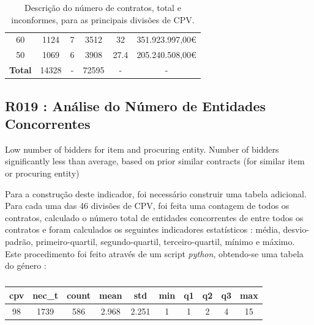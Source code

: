 \begin{table}[H]
{\begin{tabular}{cccccc}
		60                   & 1124                                                                                & 7           & 3512                                                                          & 32          & 351.923.997,00€                                                           \\
		50                   & 1069                                                                                & 6           & 3908                                                                          & 27.4        & 205.240.508,00€                                                           \\ \midrule
		\textbf{Total}       & 14328                                                                               & -           & 72595                                                                         & -           & -                                                                         \\ \hline
	\end{tabular}%
	}
	\caption{Descrição do número de contratos, total e inconformes, para as principais divisões de CPV.}
	\label{tab:rf18stats}
\end{table}







\subsection{R019 : Análise do Número de Entidades Concorrentes}

\Lemma{}
	{
	Low number of bidders for item and procuring entity. Number of bidders significantly less than average, based on prior similar contracts (for similar item or procuring entity) 
	}


Para a construção deste indicador, foi necessário construir uma tabela adicional. Para cada uma das 46 divisões de CPV, foi feita uma contagem de todos os contratos, calculado o número total de entidades concorrentes de entre todos os contratos e foram calculados os seguintes indicadores estatísticos : média, desvio-padrão, primeiro-quartil, segundo-quartil, terceiro-quartil, mínimo e máximo. Este procedimento foi feito através de um script \textit{python}, obtendo-se uma tabela do género : 

\begin{table}[H]
	\centering
	\begin{tabular}{|c|c|c|c|c|c|c|c|c|c|}
		\hline
		\textbf{cpv} & \textbf{nec\_t} & \textbf{count} & \textbf{mean} & \textbf{std} & \textbf{min} & \textbf{q1} & \textbf{q2} & \textbf{q3} & \textbf{max} \\ \hline
		98           & 1739            & 586            & 2.968         & 2.251        & 1            & 1           & 2           & 4           & 15           \\ \hline
	\end{tabular}
	\caption{}
\end{table}

